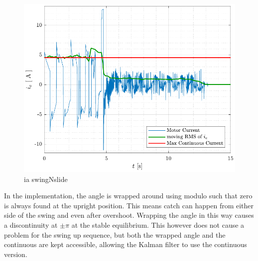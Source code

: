 \begin{figure}[H]
  \includegraphics[width=.42\textwidth]{figures/ia_swingNslide}
  \caption{ ia swingNslide }
  \label{fig:ia_swingNslide}
\end{figure}

In the implementation, the angle is wrapped around using modulo such that zero is always found at the upright position. This means catch can happen from either side of the swing and even after overshoot. Wrapping the angle in this way causes a discontinuity at $\pm \pi$ at the stable equilibrium. This however does not cause a problem for the swing up sequence, but both the wrapped angle and the continuous are kept accessible, allowing the Kalman filter to use the continuous version.